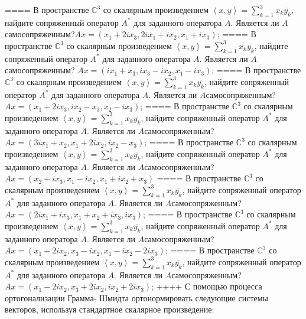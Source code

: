 ====
В пространстве \(\mathbb{C}^{3}\) со скалярным произведением \(\left\langle x,y \right\rangle = \sum_{k = 1}^{3}{x_{k}\overline{y_{k}}}\), найдите сопряженный оператор \(A^{*}\) для заданного оператора \(A\). Является ли \(A\)самосопряженным?\(Ax = \left( x_{1} + 2ix_{3},2ix_{1} + ix_{2},x_{1} + ix_{3} \right)\);
====
В пространстве \(\mathbb{C}^{3}\) со скалярным произведением \(\left\langle x,y \right\rangle = \sum_{k = 1}^{3}{x_{k}\overline{y_{k}}}\), найдите сопряженный оператор \(A^{*}\) для заданного оператора \(A\). Является ли \(A\)самосопряженным? \(Ax = \left( ix_{1} + x_{3},ix_{3} - ix_{2},x_{1} - ix_{3} \right)\);
====
В пространстве \(\mathbb{C}^{3}\) со скалярным произведением \(\left\langle x,y \right\rangle = \sum_{k = 1}^{3}{x_{k}\overline{y_{k}}}\), найдите сопряженный оператор \(A^{*}\) для заданного оператора \(A\). Является ли \(A\)самосопряженным? \(Ax = \left( x_{1} + 2ix_{3},ix_{2} - x_{3},x_{2} - ix_{3} \right)\);
====
В пространстве \(\mathbb{C}^{3}\) со скалярным произведением \(\left\langle x,y \right\rangle = \sum_{k = 1}^{3}{x_{k}\overline{y_{k}}}\), найдите сопряженный оператор \(A^{*}\) для заданного оператора \(A\). Является ли \(A\)самосопряженным? \(Ax = \left( 3ix_{1} + x_{2},x_{1} + 2ix_{2},ix_{2} - x_{3} \right)\);
====
В пространстве \(\mathbb{C}^{3}\) со скалярным произведением \(\left\langle x,y \right\rangle = \sum_{k = 1}^{3}{x_{k}\overline{y_{k}}}\), найдите сопряженный оператор \(A^{*}\) для заданного оператора \(A\). Является ли \(A\)самосопряженным? \(Ax = \left( x_{2} + ix_{3},x_{1} - ix_{2},x_{1} + ix_{2} + x_{3} \right)\)
====
В пространстве \(\mathbb{C}^{3}\) со скалярным произведением \(\left\langle x,y \right\rangle = \sum_{k = 1}^{3}{x_{k}\overline{y_{k}}}\), найдите сопряженный оператор \(A^{*}\) для заданного оператора \(A\). Является ли \(A\)самосопряженным? \(Ax = \left( 2ix_{1} + ix_{3},x_{1} + x_{2} + ix_{3},ix_{3} \right)\);
====
В пространстве \(\mathbb{C}^{3}\) со скалярным произведением \(\left\langle x,y \right\rangle = \sum_{k = 1}^{3}{x_{k}\overline{y_{k}}}\), найдите сопряженный оператор \(A^{*}\) для заданного оператора \(A\). Является ли \(A\)самосопряженным?\(Ax = \left( x_{1} + 2ix_{2},x_{3} - ix_{2},x_{1} - ix_{2} - 2ix_{3} \right)\);
====
В пространстве \(\mathbb{C}^{3}\) со скалярным произведением \(\left\langle x,y \right\rangle = \sum_{k = 1}^{3}{x_{k}\overline{y_{k}}}\), найдите сопряженный оператор \(A^{*}\) для заданного оператора \(A\). Является ли \(A\)самосопряженным?\(Ax = \left( x_{1} - 2ix_{2},x_{3} + 2ix_{2},ix_{2} + 2ix_{3} \right)\);
++++
С помощью процесса ортогонализации Грамма- Шмидта ортонормировать следующие системы векторов, используя стандартное скалярное произведение:
